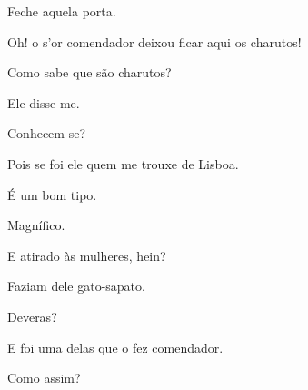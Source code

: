   Feche aquela porta. 

  Oh! o
s'or comendador deixou ficar aqui os charutos!

  Como sabe que são charutos?

  Ele disse{}-me.

  Conhecem{}-se?

  Pois se foi ele quem me trouxe de Lisboa.

  É um bom tipo.

  Magnífico.

  E atirado às mulheres, hein?

  Faziam dele gato{}-sapato.

  Deveras?

  E foi uma delas que o fez comendador.

  Como assim?

